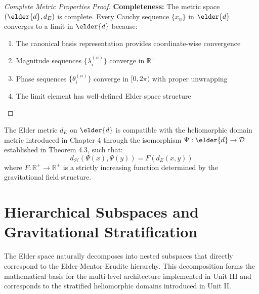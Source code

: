 \begin{proof}[Complete Metric Properties Proof]
\textbf{Completeness:} The metric space $(\elder{d}, d_E)$ is complete. Every Cauchy sequence $\{x_n\}$ in $\elder{d}$ converges to a limit in $\elder{d}$ because:
\begin{enumerate}
    \item The canonical basis representation provides coordinate-wise convergence
    \item Magnitude sequences $\{\lambda_i^{(n)}\}$ converge in $\mathbb{R}^+$
    \item Phase sequences $\{\theta_i^{(n)}\}$ converge in $[0, 2\pi)$ with proper unwrapping
    \item The limit element has well-defined Elder space structure
\end{enumerate}
\end{proof}

\begin{proposition}
\label{prop:heliomorphic_metric_connection}
The Elder metric $d_E$ on $\elder{d}$ is compatible with the heliomorphic domain metric introduced in Chapter 4 through the isomorphism $\Psi: \elder{d} \rightarrow \mathcal{D}$ established in Theorem 4.3, such that:
\begin{equation}
d_{\mathcal{H}}(\Psi(x), \Psi(y)) = F(d_E(x, y))
\end{equation}
where $F: \mathbb{R}^+ \rightarrow \mathbb{R}^+$ is a strictly increasing function determined by the gravitational field structure.
\end{proposition}

\section{Hierarchical Subspaces and Gravitational Stratification}

The Elder space naturally decomposes into nested subspaces that directly correspond to the Elder-Mentor-Erudite hierarchy. This decomposition forms the mathematical basis for the multi-level architecture implemented in Unit III and corresponds to the stratified heliomorphic domains introduced in Unit II.

